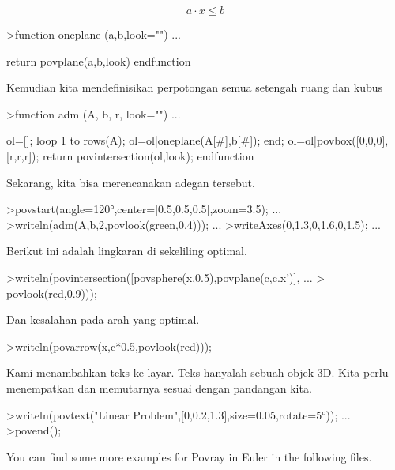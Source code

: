 \documentclass{article}
\begin{document}
\begin{eulernotebook}
\begin{eulercomment}
\begin{eulercomment}
\begin{eulercomment}
\end{eulercomment}
\begin{eulerformula}
\[
a \cdot x \le b
\]
\end{eulerformula}
\begin{eulerprompt}
>function oneplane (a,b,look="") ...
\end{eulerprompt}
\begin{eulerudf}
    return povplane(a,b,look)
  endfunction
\end{eulerudf}
\begin{eulercomment}
Kemudian kita mendefinisikan perpotongan semua setengah ruang dan
kubus
\end{eulercomment}
\begin{eulerprompt}
>function adm (A, b, r, look="") ...
\end{eulerprompt}
\begin{eulerudf}
    ol=[];
    loop 1 to rows(A); ol=ol|oneplane(A[#],b[#]); end;
    ol=ol|povbox([0,0,0],[r,r,r]);
    return povintersection(ol,look);
  endfunction
\end{eulerudf}
\begin{eulercomment}
Sekarang, kita bisa merencanakan adegan tersebut.
\end{eulercomment}
\begin{eulerprompt}
>povstart(angle=120°,center=[0.5,0.5,0.5],zoom=3.5); ...
>writeln(adm(A,b,2,povlook(green,0.4))); ...
>writeAxes(0,1.3,0,1.6,0,1.5); ...
\end{eulerprompt}
\begin{eulercomment}
Berikut ini adalah lingkaran di sekeliling optimal.
\end{eulercomment}
\begin{eulerprompt}
>writeln(povintersection([povsphere(x,0.5),povplane(c,c.x')], ...
>  povlook(red,0.9)));
\end{eulerprompt}
\begin{eulercomment}
Dan kesalahan pada arah yang optimal.
\end{eulercomment}
\begin{eulerprompt}
>writeln(povarrow(x,c*0.5,povlook(red)));
\end{eulerprompt}
\begin{eulercomment}
Kami menambahkan teks ke layar. Teks hanyalah sebuah objek 3D. Kita
perlu menempatkan dan memutarnya sesuai dengan pandangan kita.
\end{eulercomment}
\begin{eulerprompt}
>writeln(povtext("Linear Problem",[0,0.2,1.3],size=0.05,rotate=5°)); ...
>povend();
\end{eulerprompt}
\begin{eulercomment}
You can find some more examples for Povray in Euler in the following
files.


\end{eulercomment}
\end{eulercomment}
\end{eulercomment}
\end{eulernotebook}
\end{document}
